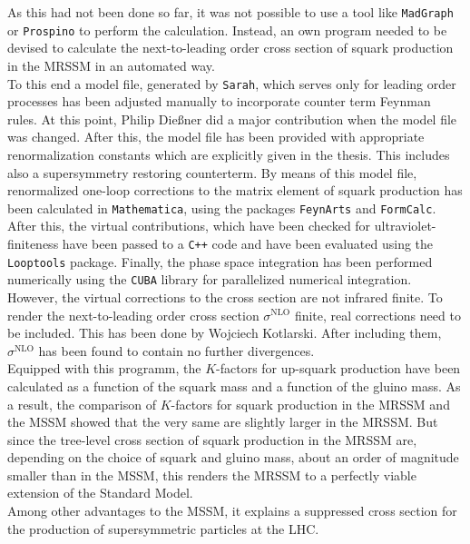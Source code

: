 As this had not been done so far, it was not possible to use a tool like \texttt{MadGraph} or \texttt{Prospino} to perform the calculation. Instead, an own program needed to be devised to calculate the next-to-leading order cross section of squark production in the MRSSM in an automated way.\\
To this end a model file, generated by \texttt{Sarah}, which serves only for leading order processes has been adjusted manually to incorporate counter term Feynman rules. At this point, Philip Dießner did a major contribution when the model file was changed. After this, the model file has been provided with appropriate renormalization constants which are explicitly given in the thesis. This includes also a supersymmetry restoring counterterm. By means of this model file, renormalized one-loop corrections to the matrix element of squark production has been calculated in \texttt{Mathematica}, using the packages \texttt{FeynArts} and \texttt{FormCalc}. After this, the virtual contributions, which have been checked for ultraviolet-finiteness have been passed to a \texttt{C++} code and have been evaluated using the \texttt{Looptools} package. Finally, the phase space integration has been performed numerically using the \texttt{CUBA} library for parallelized numerical integration. However, the virtual corrections to the cross section are not infrared finite. To render the next-to-leading order cross section $\sigma^{\mathrm{NLO}}$ finite, real corrections need to be included. This has been done by Wojciech Kotlarski. After including them, $\sigma^{\mathrm{NLO}}$ has been found to contain no further divergences.\\
Equipped with this programm, the $K$-factors for up-squark production have been calculated as a function of the squark mass and a function of the gluino mass. As a result, the comparison of $K$-factors for squark production in the MRSSM and the MSSM showed that the very same are slightly larger in the MRSSM. But since the tree-level cross section of squark production in the MRSSM are, depending on the choice  of squark and gluino mass, about an order of magnitude smaller than in the MSSM, this renders the MRSSM to a perfectly viable extension of the Standard Model.\\
Among other advantages to the MSSM, it explains a suppressed cross section for the production of supersymmetric particles at the LHC.

